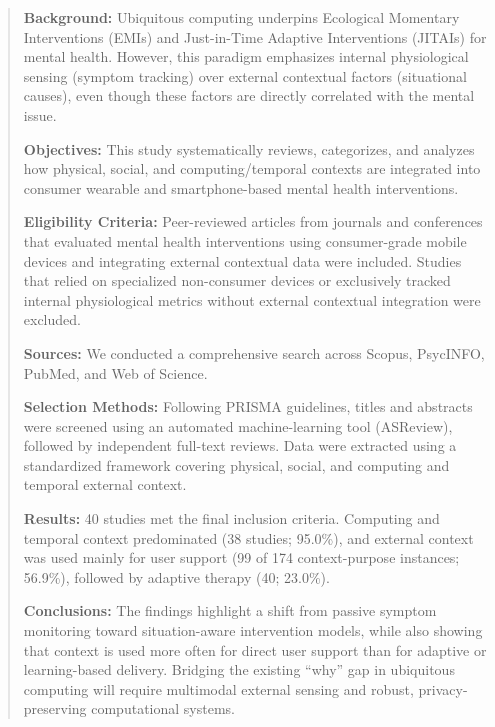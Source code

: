 
\begin{abstract}
\noindent
\textbf{Background:}
Ubiquitous computing underpins Ecological Momentary Interventions (EMIs) and Just-in-Time Adaptive Interventions (JITAIs) for mental health. However, this paradigm emphasizes internal physiological sensing (symptom tracking) over external contextual factors (situational causes), even though these factors are directly correlated with the mental issue.\newline

\noindent
\textbf{Objectives:}
This study systematically reviews, categorizes, and analyzes how physical, social, and computing/temporal contexts are integrated into consumer wearable and smartphone-based mental health interventions.\newline

\noindent
\textbf{Eligibility Criteria:}
Peer-reviewed articles from journals and conferences that evaluated mental health interventions using consumer-grade mobile devices and integrating external contextual data were included. Studies that relied on specialized non-consumer devices or exclusively tracked internal physiological metrics without external contextual integration were excluded.\newline

\noindent
\textbf{Sources:}
We conducted a comprehensive search across Scopus, PsycINFO, PubMed, and Web of Science.\newline

\noindent
\textbf{Selection Methods:}
Following PRISMA guidelines, titles and abstracts were screened using an automated machine-learning tool (ASReview), followed by independent full-text reviews. Data were extracted using a standardized framework covering physical, social, and computing and temporal external context.\newline

\noindent
\textbf{Results:}
40 studies met the final inclusion criteria. Computing and temporal context predominated (38 studies; 95.0\%), and external context was used mainly for user support (99 of 174 context-purpose instances; 56.9\%), followed by adaptive therapy (40; 23.0\%).\newline
\newline

\noindent
\textbf{Conclusions:}
The findings highlight a shift from passive symptom monitoring toward situation-aware intervention models, while also showing that context is used more often for direct user support than for adaptive or learning-based delivery. Bridging the existing ``why'' gap in ubiquitous computing will require multimodal external sensing and robust, privacy-preserving computational systems.\newline

\end{abstract}